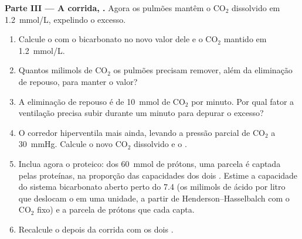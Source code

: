 \begin{problem}
\medskip
\noindent\textbf{Parte III --- A corrida, .}
Agora os pulmões mantêm o $\mathrm{CO_2}$ dissolvido em
\qty{1.2}{mmol/L}, expelindo o excesso.
\begin{enumerate}[resume]
  \item Calcule o  com o bicarbonato no novo valor dele e o
        $\mathrm{CO_2}$ mantido em \qty{1.2}{mmol/L}.
  \item Quantos milimols de $\mathrm{CO_2}$ os pulmões precisam remover,
        além da eliminação de repouso, para manter o valor?
  \item A eliminação de repouso é de \qty{10}{mmol} de $\mathrm{CO_2}$
        por minuto. Por qual fator a ventilação precisa subir durante um
        minuto para depurar o excesso?
  \item O corredor hiperventila mais ainda, levando a pressão parcial de
        $\mathrm{CO_2}$ a \qty{30}{mmHg}. Calcule o novo $\mathrm{CO_2}$
        dissolvido e o .
  \item Inclua agora o  proteico: dos \qty{60}{mmol} de prótons,
        uma parcela é captada pelas proteínas, na proporção das
        capacidades dos dois . Estime a capacidade do sistema
        bicarbonato aberto perto do  7.4 (os milimols de ácido por
        litro que deslocam o  em uma unidade, a partir de
        Henderson--Hasselbalch com o $\mathrm{CO_2}$ fixo) e a parcela
        de prótons que cada  capta.
  \item Recalcule o  depois da corrida com os dois .
\end{enumerate}


\end{problem}
